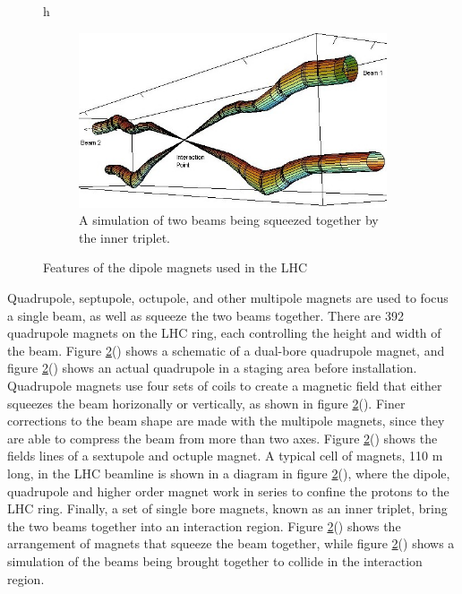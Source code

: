 \begin{figure}{h}
\begin{subfigure}[h]{0.450\textwidth}
        \includegraphics[width=\textwidth]{Figures/LHC_Diagrams/LHC_InteractionRegion.jpg}
        \caption{A simulation of two beams being squeezed together by
          the inner triplet.}\label{fig:lhc_beam_squeeze}
      \end{subfigure}
       \caption{Features of the dipole magnets used in the LHC}\label{fig:lhc_multipole}
\end{figure}


\par Quadrupole, septupole, octupole, and other multipole magnets are
used to focus a single beam, as well as squeeze the two beams
together.  There are 392 quadrupole magnets
on the LHC ring, each controlling the height and width of the beam.
Figure \ref{fig:lhc_multipole}() shows a
schematic of a dual-bore quadrupole magnet, and figure
\ref{fig:lhc_multipole}() shows an
actual quadrupole in a staging area before  installation.  Quadrupole
magnets use four sets of coils to create a magnetic field that either
squeezes the beam horizonally or vertically, as shown in figure
\ref{fig:lhc_multipole}(). Finer
corrections to the beam shape are made with the multipole magnets,
since they are able to compress the beam from more than two axes.
Figure \ref{fig:lhc_multipole}()
shows the fields lines of a sextupole and  octuple magnet.  A typical
cell of magnets, 110 m long, in the LHC beamline is shown in a diagram
in figure \ref{fig:lhc_multipole}(), where the dipole, 
quadrupole and higher order magnet work in series to confine the
protons to the LHC ring.  Finally, a set of single bore magnets, known
as an inner triplet, bring the two beams together into an interaction
region.  Figure
\ref{fig:lhc_multipole}() shows the
arrangement of magnets that squeeze the beam together, while figure
\ref{fig:lhc_multipole}() shows a
simulation of the beams being brought together to collide in the
interaction region.  


